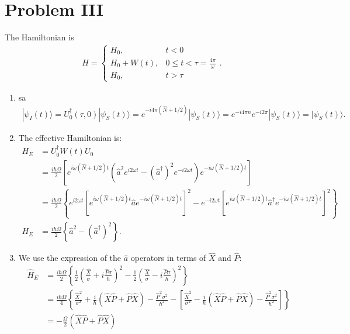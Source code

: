 \documentclass[letterpaper,11pt,twoside]{article}
\newcommand{\ket}[1]{|#1\rangle}
\begin{document}
\section*{Problem III}
The Hamiltonian is 
\begin{align*}
  H=\begin{cases}
    H_0,&t<0\\
    H_0+W(t),&0\leq t<\tau=\frac{4\pi}{\omega}\\
    H_0,&t>\tau
  \end{cases}.
\end{align*}
\begin{enumerate}[itemsep=0pt,topsep=0pt,label=\alph*)]
  \item sa
  \begin{align*}
    \ket{\psi_I(t)}=U_0^\dagger(\tau,0)\ket{\psi_S(t)}=e^{-i4\pi(\hat{N}+1/2)}\ket{\psi_S(t)}=e^{-i4\pi n}e^{-i2\pi}\ket{\psi_S(t)}=\ket{\psi_S(t)}.
  \end{align*}
  \item The effective Hamiltonian is:
  \begin{align*}
    H_E&=U_0^\dagger W(t)U_0\\
    &=\frac{i\hbar\Omega}{2}\left[e^{i\omega(\hat{N}+1/2)t}(\hat{a}^2e^{i2\omega t}-(\hat{a}^\dagger)^2e^{-i2\omega t})e^{-i\omega(\hat{N}+1/2)t}\right]\\
    &=\frac{i\hbar\Omega}{2}\left\{e^{i2\omega t}[e^{i\omega(\hat{N}+1/2)t}\hat{a}e^{-i\omega(\hat{N}+1/2)t}]^2-e^{-i2\omega t}[e^{i\omega(\hat{N}+1/2)t}\hat{a}^\dagger e^{-i\omega(\hat{N}+1/2)t}]^2\right\}\\
    H_E&=\frac{i\hbar\Omega}{2}\left\{\hat{a}^2-(\hat{a}^\dagger)^2\right\}.
  \end{align*}
  \item We use the expression of the $\hat{a}$ operators in terms of $\hat{X}$ and $\hat{P}$:
  \begin{align*}
    \hat{H}_E&=\frac{i\hbar\Omega}{2}\left\{\frac{1}{2}\left(\frac{\hat{X}}{\sigma}+i\frac{\hat{P}\sigma}{\hbar}\right)^2-\frac{1}{2}\left(\frac{\hat{X}}{\sigma}-i\frac{\hat{P}\sigma}{\hbar}\right)^2\right\}\\
    &=\frac{i\hbar\Omega}{4}\left\{\frac{\hat{X}^2}{\sigma^2}+\frac{i}{\hbar}(\hat{X}\hat{P}+\hat{P}\hat{X})-\frac{\hat{P}^2\sigma^2}{\hbar^2}-\left[\frac{\hat{X}^2}{\sigma^2}-\frac{i}{\hbar}(\hat{X}\hat{P}+\hat{P}\hat{X})-\frac{\hat{P}^2\sigma^2}{\hbar^2}\right]\right\}\\
    &=-\frac{\Omega}{2}(\hat{X}\hat{P}+\hat{P}\hat{X})\\

\end{align*}
\end{enumerate}
\end{document}
